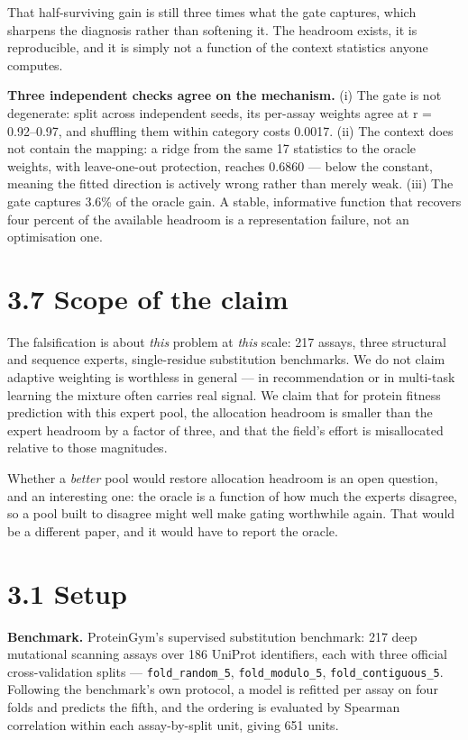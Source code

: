 \documentclass[sigconf,review,nonacm]{acmart}
\begin{document}
That half-surviving gain is still three times what the gate captures, which sharpens the diagnosis
rather than softening it. The headroom exists, it is reproducible, and it is simply not a function of
the context statistics anyone computes.

\textbf{Three independent checks agree on the mechanism.} (i) The gate is not degenerate: split across
independent seeds, its per-assay weights agree at r = 0.92--0.97, and shuffling them within category
costs 0.0017. (ii) The context does not contain the mapping: a ridge from the same 17 statistics to the
oracle weights, with leave-one-out protection, reaches 0.6860 --- below the constant, meaning the fitted
direction is actively wrong rather than merely weak. (iii) The gate captures 3.6\% of the oracle gain.
A stable, informative function that recovers four percent of the available headroom is a representation
failure, not an optimisation one.

\hypertarget{scope-of-the-claim}{%
\section{3.7 Scope of the claim}\label{scope-of-the-claim}}

The falsification is about \emph{this} problem at \emph{this} scale: 217 assays, three structural and sequence
experts, single-residue substitution benchmarks. We do not claim adaptive weighting is worthless in
general --- in recommendation or in multi-task learning the mixture often carries real signal. We claim
that for protein fitness prediction with this expert pool, the allocation headroom is smaller than the
expert headroom by a factor of three, and that the field's effort is misallocated relative to those
magnitudes.

Whether a \emph{better} pool would restore allocation headroom is an open question, and an interesting one:
the oracle is a function of how much the experts disagree, so a pool built to disagree might well make
gating worthwhile again. That would be a different paper, and it would have to report the oracle.

\hypertarget{setup}{%
\section{3.1 Setup}\label{setup}}

\textbf{Benchmark.} ProteinGym's supervised substitution benchmark: 217 deep mutational scanning assays over
186 UniProt identifiers, each with three official cross-validation splits --- \texttt{fold\_random\_5},
\texttt{fold\_modulo\_5}, \texttt{fold\_contiguous\_5}. Following the benchmark's own protocol, a model is refitted per
assay on four folds and predicts the fifth, and the ordering is evaluated by Spearman correlation
within each assay-by-split unit, giving 651 units.
\end{document}
